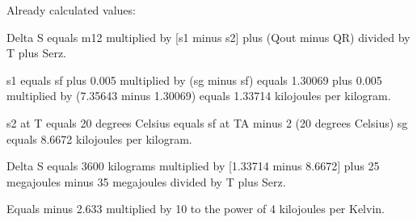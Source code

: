 Already calculated values:  

Delta S equals m12 multiplied by [s1 minus s2] plus (Qout minus QR) divided by T plus Serz.  

s1 equals sf plus 0.005 multiplied by (sg minus sf) equals 1.30069 plus 0.005 multiplied by (7.35643 minus 1.30069) equals 1.33714 kilojoules per kilogram.  

s2 at T equals 20 degrees Celsius equals sf at TA minus 2 (20 degrees Celsius) sg equals 8.6672 kilojoules per kilogram.  

Delta S equals 3600 kilograms multiplied by [1.33714 minus 8.6672] plus 25 megajoules minus 35 megajoules divided by T plus Serz.  

Equals minus 2.633 multiplied by 10 to the power of 4 kilojoules per Kelvin.